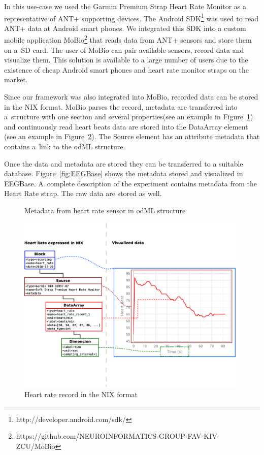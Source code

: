 \documentclass[conference]{IEEEtran}
\begin{document}
In this use-case we used the Garmin Premium Strap Heart Rate Monitor as a representative of ANT+ supporting devices. The Android SDK\footnote{http://developer.android.com/sdk/} was used to read ANT+ data at Android smart phones. We integrated this SDK into a custom mobile application MoBio\footnote{https://github.com/NEUROINFORMATICS-GROUP-FAV-KIV-ZCU/MoBio} that reads data from ANT+ sensors and store them on a~SD card. The user of MoBio can pair available sensors, record data and visualize them. This solution is available to a large number of users due to the existence of cheap Android smart phones and heart rate monitor straps on the market.

Since our framework was also integrated into MoBio, recorded data can be stored in the NIX format. MoBio parses the record, metadata are transferred into a~structure with one section and several properties(see an example in Figure~\ref{odML}) and continuously read heart beats data are stored into the DataArray element (see an example in Figure~\ref{NIX-ex}). The Source element has an attribute metadata that contains a~link to the odML structure.

Once the data and metadata are stored they can be transferred to a suitable database. Figure~\ref{fig:EEGBase} shows the metadata stored and visualized in EEGBase. A~complete description of the experiment contains metadata from the Heart Rate strap. The raw data are stored as well.

\begin{figure}

\caption{\label{odML}Metadata from heart rate sensor in odML structure}
\end{figure}

\begin{figure}
\centering\includegraphics[width=11cm]{NIX-example.eps}
\caption{\label{NIX-ex}Heart rate record in the NIX format}
\end{figure}
\end{document}
